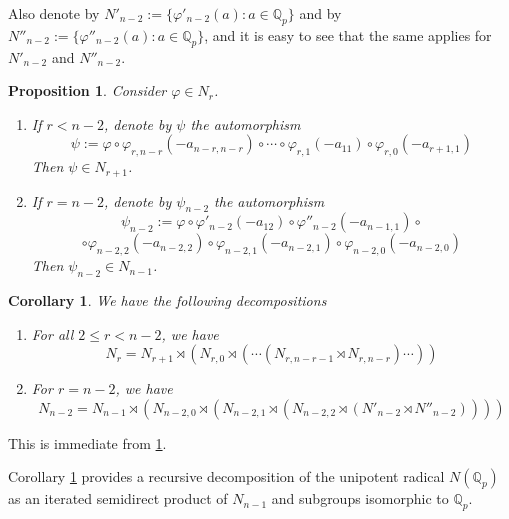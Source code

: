 \documentclass[12pt]{article}
\newtheorem{proposition}[theorem]{Proposition}
\newtheorem{corollary}[theorem]{Corollary}
\begin{document}
Also denote by $N'_{n-2}:=\{\varphi'_{n-2}(a) : a\in\mathbb{Q}_{p}\}$ and by $N''_{n-2}:=\{\varphi''_{n-2}(a) : a\in\mathbb{Q}_{p}\}$, and it is easy to see that the same applies for $N'_{n-2}$ and $N''_{n-2}$.
\begin{proposition}
\label{prop:psi.automorphism}
Consider $\varphi\in{N_{r}}$.
\begin{enumerate}
    \item 
If $r<n-2$, denote by $\psi$ the automorphism \[\psi:=\varphi\circ\varphi_{r,n-r}(-a_{n-r,n-r})\circ\cdots\circ\varphi_{r,1}(-a_{11})\circ\varphi_{r,0}(-a_{r+1,1})\]
Then $\psi\in{N_{r+1}}$.
    \item 
If $r=n-2$, denote by $\psi_{n-2}$ the automorphism \[\psi_{n-2}:=\varphi\circ\varphi'_{n-2}(-a_{12})\circ\varphi''_{n-2}(-a_{n-1,1})\circ\]\[\circ\varphi_{n-2,2}(-a_{n-2,2})\circ\varphi_{n-2,1}(-a_{n-2,1})\circ\varphi_{n-2,0}(-a_{n-2,0})\]
Then $\psi_{n-2}\in{N_{n-1}}$.
\end{enumerate}
\end{proposition}
\begin{corollary}
\label{cor:Nr.decomposition}
We have the following decompositions
\begin{enumerate}
    \item 
For all $2\leq{r}<{n-2}$, we have \[N_{r}=N_{r+1}\rtimes(N_{r,0}\rtimes(\cdots(N_{r,n-r-1}\rtimes{N_{r,n-r}})\cdots))\]
\item For $r=n-2$, we have 
\[N_{n-2}=N_{n-1}\rtimes({N_{n-2,0}}\rtimes(N_{n-2,1}\rtimes(N_{n-2,2}\rtimes(N'_{n-2}\rtimes{N''_{n-2}}))))\]
\end{enumerate}
\end{corollary}
This is immediate from \ref{prop:psi.automorphism}.

Corollary \ref{cor:Nr.decomposition} provides a recursive decomposition of the unipotent radical $N(\mathbb{Q}_{p})$ as an iterated semidirect product of $N_{n-1}$ and subgroups isomorphic to $\mathbb{Q}_{p}$.
\end{document}
